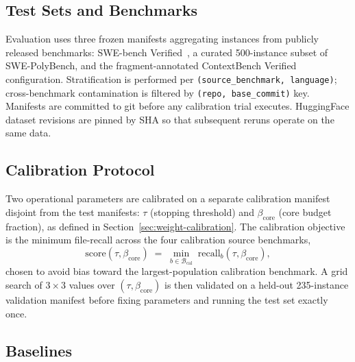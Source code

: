 \documentclass[11pt, a4paper]{article}
\begin{document}
\subsection{Test Sets and Benchmarks}

Evaluation uses three frozen manifests aggregating instances from publicly released benchmarks: SWE-bench Verified~\cite{jimenez2024swebench}, a curated 500-instance subset of SWE-PolyBench, and the fragment-annotated ContextBench Verified configuration. Stratification is performed per \texttt{(source\_benchmark, language)}; cross-benchmark contamination is filtered by \texttt{(repo, base\_commit)} key. Manifests are committed to git before any calibration trial executes. HuggingFace dataset revisions are pinned by SHA so that subsequent reruns operate on the same data.

\subsection{Calibration Protocol}

Two operational parameters are calibrated on a separate calibration manifest disjoint from the test manifests: $\tau$ (stopping threshold) and $\beta_{\mathrm{core}}$ (core budget fraction), as defined in Section~\ref{sec:weight-calibration}. The calibration objective is the minimum file-recall across the four calibration source benchmarks,
\begin{equation}
\mathrm{score}(\tau, \beta_{\mathrm{core}}) \;=\; \min_{b \in \mathcal{B}_{\mathrm{cal}}} \; \mathrm{recall}_b(\tau, \beta_{\mathrm{core}}),
\end{equation}
chosen to avoid bias toward the largest-population calibration benchmark. A grid search of $3{\times}3$ values over $(\tau, \beta_{\mathrm{core}})$ is then validated on a held-out 235-instance validation manifest before fixing parameters and running the test set exactly once.

\subsection{Baselines}
\end{document}

